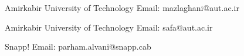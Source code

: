 

\begin{cventries}

{Amirkabir University of Technology}
{Email: mazlaghani@aut.ac.ir}{}

{Amirkabir University of Technology}
{Email: safa@aut.ac.ir}{}

\end{cventries}


\begin{cventries}

{Snapp!}
{Email: parham.alvani@snapp.cab}{}

\end{cventries}
